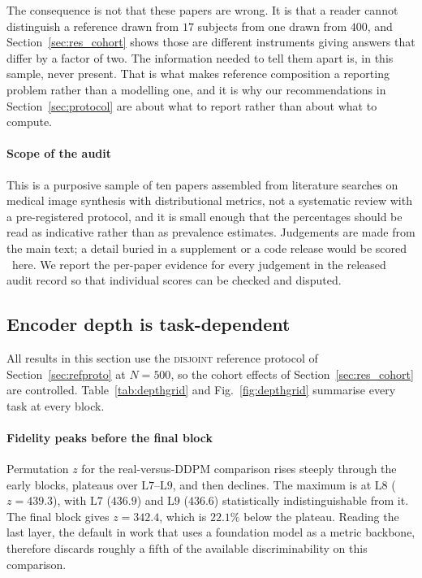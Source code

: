 \documentclass[preprint,12pt,authoryear]{elsarticle}
\newcommand{\xmark}{\ding{55}}
\newcommand{\Lb}[1]{\ensuremath{\mathrm{L}#1}}
\begin{document}
The consequence is not that these papers are wrong. It is that a reader cannot
distinguish a reference drawn from $17$ subjects from one drawn from $400$,
and Section~\ref{sec:res_cohort} shows those are different instruments giving
answers that differ by a factor of two. The information needed to tell them
apart is, in this sample, never present. That is what makes reference
composition a reporting problem rather than a modelling one, and it is why our
recommendations in Section~\ref{sec:protocol} are about what to report rather
than about what to compute.

\paragraph{Scope of the audit}
This is a purposive sample of ten papers assembled from literature searches on
medical image synthesis with distributional metrics, not a systematic review
with a pre-registered protocol, and it is small enough that the percentages
should be read as indicative rather than as prevalence estimates. Judgements
are made from the main text; a detail buried in a supplement or a code release
would be scored \xmark\ here. We report the per-paper evidence for every
judgement in the released audit record so that individual scores can be
checked and disputed.
\subsection{Encoder depth is task-dependent}
\label{sec:res_depth}

All results in this section use the \textsc{disjoint} reference protocol of
Section~\ref{sec:refproto} at $N = 500$, so the cohort effects of
Section~\ref{sec:res_cohort} are controlled. Table~\ref{tab:depthgrid} and
Fig.~\ref{fig:depthgrid} summarise every task at every block.

\paragraph{Fidelity peaks before the final block}
Permutation $z$ for the real-versus-DDPM comparison rises steeply through the
early blocks, plateaus over \Lb{7}--\Lb{9}, and then declines. The maximum is at
\Lb{8} ($z = 439.3$), with \Lb{7} ($436.9$) and \Lb{9} ($436.6$) statistically
indistinguishable from it. The final block gives $z = 342.4$, which is $22.1\%$
below the plateau. Reading the last layer, the default in work that uses a
foundation model as a metric backbone, therefore discards roughly a fifth of the
available discriminability on this comparison.
\end{document}
